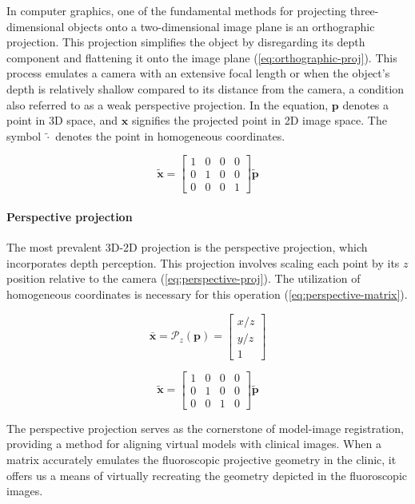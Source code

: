 In computer graphics, one of the fundamental methods for projecting three-dimensional objects onto a two-dimensional image plane is an orthographic projection.
This projection simplifies the object by disregarding its depth component and flattening it onto the image plane (\cref{eq:orthographic-proj}).
This process emulates a camera with an extensive focal length or when the object's depth is relatively shallow compared to its distance from the camera, a condition also referred to as a weak perspective projection.
In the equation, $\mathbf{p}$ denotes a point in 3D space, and $\mathbf{x}$ signifies the projected point in 2D image space. The symbol $\tilde{\cdot}$ denotes the point in homogeneous coordinates.

\begin{equation}
    \tilde{\mathbf{x}} = \begin{bmatrix}
        1 & 0 & 0 & 0 \\ 0 & 1 & 0 & 0 \\ 0 & 0 & 0 & 1
    \end{bmatrix}\tilde{\mathbf{p}}
    \label{eq:orthographic-proj}
\end{equation}

\paragraph*{Perspective projection}
The most prevalent 3D-2D projection is the perspective projection, which incorporates depth perception.
This projection involves scaling each point by its $z$ position relative to the camera (\cref{eq:perspective-proj}).
The utilization of homogeneous coordinates is necessary for this operation (\cref{eq:perspective-matrix}).

\begin{equation}
    \bar{\mathbf{x}} = \mathcal{P}_z(\mathbf{p}) = \begin{bmatrix}
        x/z \\ y/z \\ 1
    \end{bmatrix}
    \label{eq:perspective-proj}
\end{equation}

\begin{equation}
    \tilde{\mathbf{x}} = \begin{bmatrix}
        1 & 0 & 0 & 0 \\ 0 & 1 & 0 & 0 \\ 0 & 0 & 1 & 0 
    \end{bmatrix}\tilde{\mathbf{p}}
    \label{eq:perspective-matrix}
\end{equation}

The perspective projection serves as the cornerstone of model-image registration, providing a method for aligning virtual models with clinical images.
When a matrix accurately emulates the fluoroscopic projective geometry in the clinic, it offers us a means of virtually recreating the geometry depicted in the fluoroscopic images.

